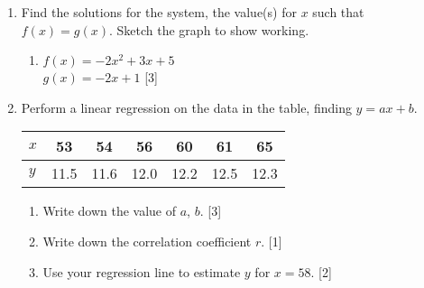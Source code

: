 \documentclass[12pt, twoside]{article}
\begin{document}
\begin{enumerate}
  \newpage
    \item Find the solutions for the system, the value(s) for $x$ such that $f(x)=g(x)$. Sketch the graph to show working.
    \begin{enumerate}
        \item $f(x)=-2x^2+3x+5$ \\[0.25cm] $g(x)=-2x+1$ \hfill [3] \vspace{0.3cm}
    \end{enumerate}

    \item Perform a linear regression on the data in the table, finding $y=ax+b$. 
        \begin{center}
        \begin{tabular}{|l|c|c|c|c|c|c|}
            \hline
            $x$ & 53 & 54 & 56 & 60 & 61 & 65 \\ 
            \hline 
            $y$ & 11.5 & 11.6 & 12.0 & 12.2 & 12.5 & 12.3 \\ 
            \hline 
            \end{tabular}
        \end{center}
        \begin{enumerate}
            \item Write down the value of $a$, $b$. \hfill [3]%
            \item Write down the correlation coefficient $r$. \hfill [1] %
            \item Use your regression line to estimate $y$ for $x=58$. \hfill [2] %
        \end{enumerate}

        
                   
\end{enumerate}
\end{document}
